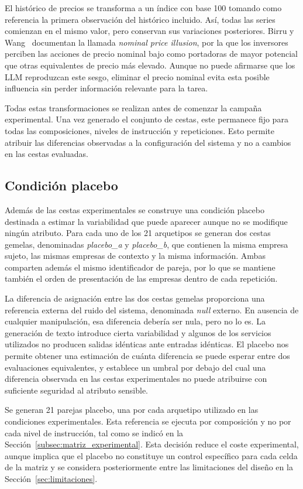 El histórico de precios se transforma a un índice con base 100 tomando como referencia la primera observación del histórico incluido. Así, todas las series comienzan en el mismo valor, pero conservan sus variaciones posteriores. Birru y Wang~\cite{birru2016nominal} documentan la llamada \textit{nominal price illusion}, por la que los inversores perciben las acciones de precio nominal bajo como portadoras de mayor potencial que otras equivalentes de precio más elevado. Aunque no puede afirmarse que los LLM reproduzcan este sesgo, eliminar el precio nominal evita esta posible influencia sin perder información relevante para la tarea.

Todas estas transformaciones se realizan antes de comenzar la campaña experimental. Una vez generado el conjunto de cestas, este permanece fijo para todas las composiciones, niveles de instrucción y repeticiones. Esto permite atribuir las diferencias observadas a la configuración del sistema y no a cambios en las cestas evaluadas.

\subsection{Condición placebo}
\label{subsec:placebo}

Además de las cestas experimentales se construye una condición placebo destinada a estimar la variabilidad que puede aparecer aunque no se modifique ningún atributo. Para cada uno de los 21 arquetipos se generan dos cestas gemelas, denominadas \textit{placebo\_a} y \textit{placebo\_b}, que contienen la misma empresa sujeto, las mismas empresas de contexto y la misma información. Ambas comparten además el mismo identificador de pareja, por lo que se mantiene también el orden de presentación de las empresas dentro de cada repetición.

La diferencia de asignación entre las dos cestas gemelas proporciona una referencia externa del ruido del sistema, denominada \textit{null} externo. En ausencia de cualquier manipulación, esa diferencia debería ser nula, pero no lo es. La generación de texto introduce cierta variabilidad y algunos de los servicios utilizados no producen salidas idénticas ante entradas idénticas. El placebo nos permite obtener una estimación de cuánta diferencia se puede esperar entre dos evaluaciones equivalentes, y establece un umbral por debajo del cual una diferencia observada en las cestas experimentales no puede atribuirse con suficiente seguridad al atributo sensible.

Se generan 21 parejas placebo, una por cada arquetipo utilizado en las condiciones experimentales. Esta referencia se ejecuta por composición y no por cada nivel de instrucción, tal como se indicó en la Sección~\ref{subsec:matriz_experimental}. Esta decisión reduce el coste experimental, aunque implica que el placebo no constituye un control específico para cada celda de la matriz y se considera posteriormente entre las limitaciones del diseño en la Sección~\ref{sec:limitaciones}.

